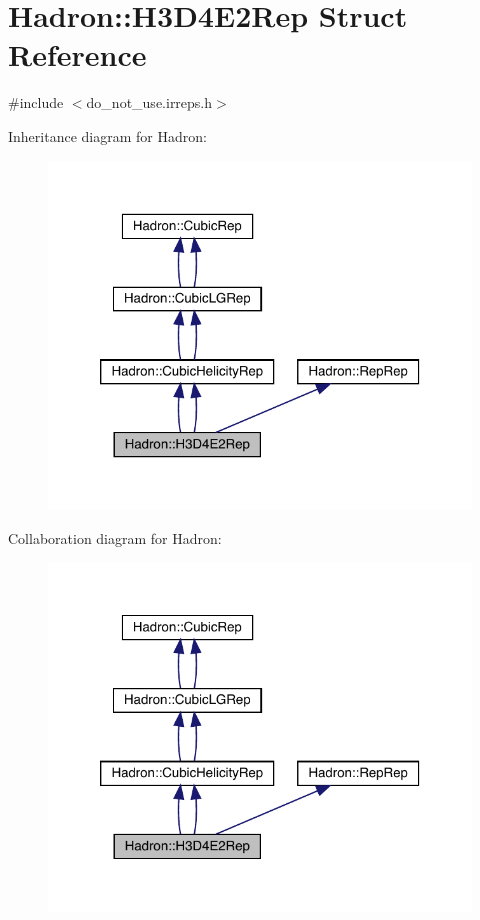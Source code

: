 \hypertarget{structHadron_1_1H3D4E2Rep}{}\section{Hadron\+:\+:H3\+D4\+E2\+Rep Struct Reference}
\label{structHadron_1_1H3D4E2Rep}


{\ttfamily \#include $<$do\+\_\+not\+\_\+use.\+irreps.\+h$>$}



Inheritance diagram for Hadron\+:\nopagebreak
\begin{figure}[H]
\begin{center}
\leavevmode
\includegraphics[width=320pt]{d0/dde/structHadron_1_1H3D4E2Rep__inherit__graph}
\end{center}
\end{figure}


Collaboration diagram for Hadron\+:\nopagebreak
\begin{figure}[H]
\begin{center}
\leavevmode
\includegraphics[width=320pt]{d1/d5b/structHadron_1_1H3D4E2Rep__coll__graph}
\end{center}
\end{figure}
